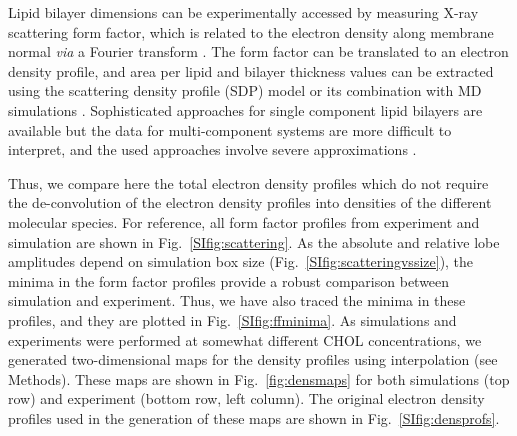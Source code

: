 \documentclass[aps,prl,superscriptaddress]{revtex4-2}
\begin{document}
Lipid bilayer dimensions can be experimentally accessed by measuring X-ray scattering form factor, which is related to the electron density along membrane normal \textit{via} a Fourier transform \cite{pan12,Heftberger15,Marquardt15,ollila16,??}. The form factor can be translated to an electron density profile, and area per lipid and bilayer thickness values can be extracted using the scattering density profile (SDP) model or its combination with MD simulations  \cite{pan12,Heftberger15,Marquardt15,??,doktorova2020molecular}. Sophisticated approaches for single component lipid bilayers are available but the data for multi-component systems are more difficult to interpret, and the used approaches involve severe approximations \cite{pan12,Heftberger15,Marquardt15,??}. 

Thus, we compare here the total electron density profiles which do not require the de-convolution of the electron density profiles into densities of the different molecular species. For reference, all form factor profiles from experiment and simulation are shown in Fig.~\ref{SIfig:scattering}. As the absolute and relative lobe amplitudes depend on simulation box size (Fig.~\ref{SIfig:scatteringvssize}), the minima in the form factor profiles provide a robust comparison between simulation and experiment. Thus, we have also traced the minima in these profiles, and they are plotted in Fig.~\ref{SIfig:ffminima}. As simulations and experiments were performed at somewhat different CHOL concentrations, we generated two-dimensional maps for the density profiles using interpolation (see Methods). These maps are shown in Fig.~\ref{fig:densmaps} for both simulations (top row) and experiment (bottom row, left column). The original electron density profiles used in the generation of these maps are shown in Fig.~\ref{SIfig:densprofs}.
\end{document}
